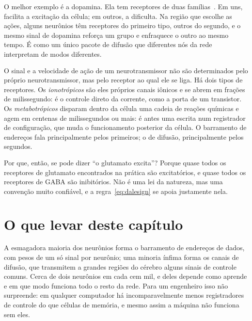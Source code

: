 O melhor exemplo é a dopamina. Ela tem receptores de duas famílias~\cite{Beaulieu2011}. Em uns, facilita a excitação da célula; em outros, a dificulta. Na região que escolhe as ações, alguns neurônios têm receptores do primeiro tipo, outros do segundo, e o mesmo sinal de dopamina reforça um grupo e enfraquece o outro ao mesmo tempo. É como um único pacote de difusão que diferentes nós da rede interpretam de modos diferentes.

\begin{keyblock}
\begin{proposition}
\label{prop:receptor}
O sinal e a velocidade de ação de um neurotransmissor não são determinados pelo próprio neurotransmissor, mas pelo receptor ao qual ele se liga. Há dois tipos de receptores. Os \emph{ionotrópicos} são eles próprios canais iônicos e se abrem em frações de milissegundo: é o controle direto da corrente, como a porta de um transistor. Os \emph{metabotrópicos} disparam dentro da célula uma cadeia de reações químicas e agem em centenas de milissegundos ou mais: é antes uma escrita num registrador de configuração, que muda o funcionamento posterior da célula. O barramento de endereços fala principalmente pelos primeiros; o de difusão, principalmente pelos segundos.
\end{proposition}
\end{keyblock}

Por que, então, se pode dizer ``o glutamato excita''? Porque quase todos os receptores de glutamato encontrados na prática são excitatórios, e quase todos os receptores de GABA são inibitórios. Não é uma lei da natureza, mas uma convenção muito confiável, e a regra~\eqref{eq:dalesign} se apoia justamente nela.

\section{O que levar deste capítulo}

A esmagadora maioria dos neurônios forma o barramento de endereços de dados, com pesos de um só sinal por neurônio; uma minoria ínfima forma os canais de difusão, que transmitem a grandes regiões do cérebro alguns sinais de controle comuns. Cerca de dois neurônios em cada cem mil, e deles depende como aprende e em que modo funciona todo o resto da rede. Para um engenheiro isso não surpreende: em qualquer computador há incomparavelmente menos registradores de controle do que células de memória, e mesmo assim a máquina não funciona sem eles.


